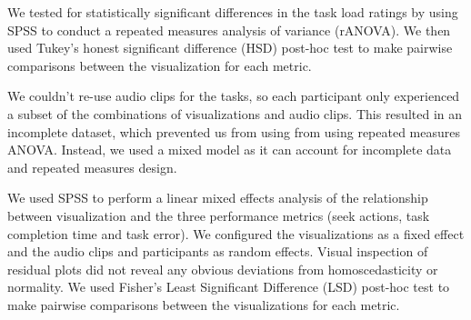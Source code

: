 We tested for statistically significant differences in the task load ratings by using SPSS to conduct a repeated
measures analysis of variance (rANOVA). We then used Tukey's honest significant difference (HSD) post-hoc test to make
pairwise comparisons between the visualization for each metric.

We couldn't re-use audio clips for the tasks, so each participant only experienced a subset of the combinations of
visualizations and audio clips. This resulted in an incomplete dataset, which prevented us from using from using
repeated measures ANOVA. Instead, we used a mixed model as it can account for incomplete data and repeated measures
design.

We used SPSS to perform a linear mixed effects analysis of the relationship between visualization and the three
performance metrics (seek actions, task completion time and task error).  We configured the visualizations as a fixed
effect and the audio clips and participants as random effects.  Visual inspection of residual plots did not reveal any
obvious deviations from homoscedasticity or normality.  We used Fisher's Least Significant Difference (LSD) post-hoc
test to make pairwise comparisons between the visualizations for each metric.



